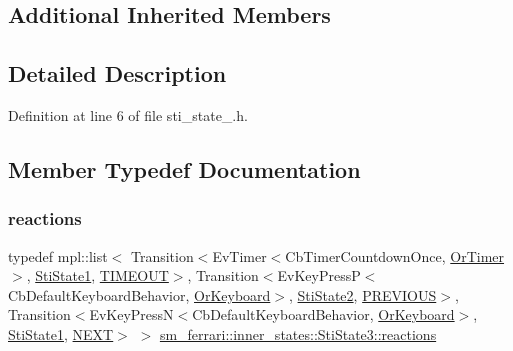 \subsection*{Additional Inherited Members}


\subsection{Detailed Description}


Definition at line 6 of file sti\+\_\+state\+\_.\+h.



\subsection{Member Typedef Documentation}
\mbox{\label{structsm__ferrari_1_1inner__states_1_1StiState3_a885d0bd3d29fc16872ecdeb1c7bd1ed1}} 
\subsubsection{\texorpdfstring{reactions}{reactions}}
{\footnotesize\ttfamily typedef mpl\+::list$<$ Transition$<$Ev\+Timer$<$Cb\+Timer\+Countdown\+Once, \hyperlink{classsm__ferrari_1_1OrTimer}{Or\+Timer}$>$, \hyperlink{structsm__ferrari_1_1inner__states_1_1StiState1}{Sti\+State1}, \hyperlink{structsm__ferrari_1_1inner__states_1_1StiState3_1_1TIMEOUT}{T\+I\+M\+E\+O\+UT}$>$, Transition$<$Ev\+Key\+PressP$<$Cb\+Default\+Keyboard\+Behavior, \hyperlink{classsm__ferrari_1_1OrKeyboard}{Or\+Keyboard}$>$, \hyperlink{structsm__ferrari_1_1inner__states_1_1StiState2}{Sti\+State2}, \hyperlink{structsm__ferrari_1_1inner__states_1_1StiState3_1_1PREVIOUS}{P\+R\+E\+V\+I\+O\+US}$>$, Transition$<$Ev\+Key\+PressN$<$Cb\+Default\+Keyboard\+Behavior, \hyperlink{classsm__ferrari_1_1OrKeyboard}{Or\+Keyboard}$>$, \hyperlink{structsm__ferrari_1_1inner__states_1_1StiState1}{Sti\+State1}, \hyperlink{structsm__ferrari_1_1inner__states_1_1StiState3_1_1NEXT}{N\+E\+XT}$>$ $>$ \hyperlink{structsm__ferrari_1_1inner__states_1_1StiState3_a885d0bd3d29fc16872ecdeb1c7bd1ed1}{sm\+\_\+ferrari\+::inner\+\_\+states\+::\+Sti\+State3\+::reactions}}



